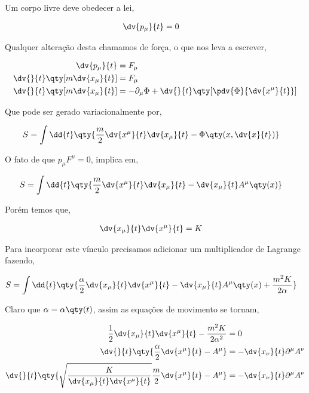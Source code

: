 \documentclass[twoside]{amsart}
\numberwithin{equation}{section}
\begin{document}
\begin{refsection}
Um corpo livre deve obedecer a lei,

\begin{align}
    \dv{p_\mu}{t}&=0
\end{align}

Qualquer alteração desta chamamos de força, o que nos leva a escrever,

\begin{align}
    \dv{p_\mu}{t}&=F_\mu\\
    \dv{}{t}\qty[m\dv{x_\mu}{t}]&=F_\mu\\
    \dv{}{t}\qty[m\dv{x_\mu}{t}]&=-\partial_\mu\Phi+\dv{}{t}\qty[\pdv{\Phi}{\dv{x^\mu}{t}}]    
\end{align}

Que pode ser gerado variacionalmente por,

\begin{align}
    S&=\int\dd{t}\qty{\frac m2\dv{x^\mu}{t}\dv{x_\mu}{t}-\Phi\qty(x, \dv{x}{t})}
\end{align}

O fato de que $p_\mu F^\mu=0$, implica em,

\begin{align}
    S&=\int\dd{t}\qty{\frac m2\dv{x^\mu}{t}\dv{x_\mu}{t}-\dv{x_\mu}{t}A^\mu\qty(x)}
\end{align}

Porém temos que,

\begin{align}
    \dv{x_\mu}{t}\dv{x^\mu}{t}&=K
\end{align}

Para incorporar este vínculo precisamos adicionar um multiplicador de Lagrange fazendo,

\begin{align*}
    S&=\int\dd{t}\qty{\frac\alpha 2\dv{x_\mu}{t}\dv{x^\mu}{t}-\dv{x_\mu}{t}A^\mu\qty(x)+\frac{m^2K}{2\alpha}}
\end{align*}

Claro que $\alpha=\alpha\qty(t)$, assim as equações de movimento se tornam,

\begin{align*}
    \frac12\dv{x_\mu}{t}\dv{x^\mu}{t}-\frac{m^2K}{2\alpha^2}&=0\\
    \dv{}{t}\qty{\frac\alpha 2\dv{x^\mu}{t}-A^\mu}&=-\dv{x_\nu}{t}\partial^\mu A^{\nu}\\
    \dv{}{t}\qty{\sqrt{\frac{K}{\dv{x_\mu}{t}\dv{x^\mu}{t}}}\frac m 2\dv{x^\mu}{t}-A^\mu}&=-\dv{x_\nu}{t}\partial^\mu A^{\nu}\\
\end{align*}


\end{refsection}
\end{document}
